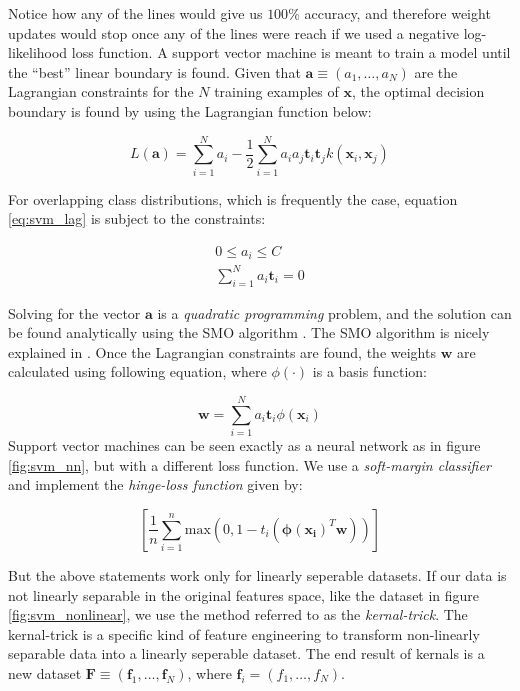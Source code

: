 \message{ !name(main.tex)}\documentclass[11pt]{article}
\begin{document}
Notice how any of the lines would give us $100\%$ accuracy, and therefore weight updates would stop once any of the lines were reach if we used a negative log-likelihood loss function. A support vector machine is meant to train a model until the ``best'' linear boundary is found. Given that $\mathbf{a} \equiv \left(a_{1},\ldots,a_{N}\right)$ are the Lagrangian constraints for the $N$ training examples of $\mathbf{x}$, the optimal decision boundary is found by using the Lagrangian function below:

\begin{equation}\label{eq:svm_lag}
  L(\mathbf{a}) = \sum_{i=1}^{N}a_{i} - \frac{1}{2}\sum_{i=1}^{N}a_{i}a_{j}\mathbf{t}_{i}\mathbf{t}_{j}k\left(\mathbf{x}_{i},\mathbf{x}_{j}\right)
\end{equation}

For overlapping class distributions, which is frequently the case, equation \ref{eq:svm_lag} is subject to the constraints:

\begin{align}
  0 \leq a_{i} \leq C\label{eq:svm_constraint1}\\
  \sum_{i=1}^{N}a_{i}\mathbf{t}_{i} = 0\label{eq:svm_constraint2}
\end{align}

Solving for the vector $\mathbf{a}$ is a \emph{quadratic programming} problem, and the solution can be found analytically using the SMO algorithm \cite{Platt_smo}. The SMO algorithm is nicely explained in \cite{ng_smo}. Once the Lagrangian constraints are found, the weights $\mathbf{w}$ are calculated using following equation, where $\phi(\cdotp)$ is a basis function:

\begin{equation}\label{eq:svm_weights}
  \mathbf{w} = \sum_{i=1}^{N}a_{i}\mathbf{t}_{i}\phi\left(\mathbf{x}_{i}\right)
\end{equation}
Support vector machines can be seen exactly as a neural network as in figure \ref{fig:svm_nn}, but with a different loss function. We use a \emph{soft-margin classifier} and implement the \emph{hinge-loss function} given by:

\begin{equation}
  \left[\frac{1}{n}\sum^{n}_{i=1}\mathrm{max}\left(0,1 - t_{i}\left(\mathbf{\phi(x_{i})}^{T}\mathbf{w}\right)\right)\right]
  \label{eq:hinge_loss}
\end{equation}

But the above statements work only for linearly seperable datasets. If our data is not linearly separable in the original features space, like the dataset in figure \ref{fig:svm_nonlinear}, we use the method referred to as the \emph{kernal-trick}. The kernal-trick is a specific kind of feature engineering to transform non-linearly separable data into a linearly seperable dataset. The end result of kernals is a new dataset $\mathbf{F} \equiv \left(\mathbf{f}_{1},\ldots,\mathbf{f}_{N}\right)$, where $\mathbf{f}_{i} = \left(f_{1},\ldots,f_{N}\right)$. 
\end{document}

